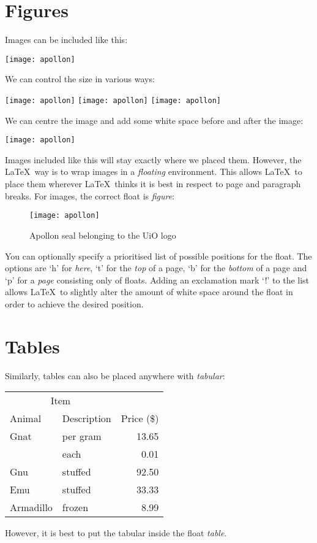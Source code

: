 \documentclass[a4paper]{memoir}
\begin{document}
\section{Figures}
Images can be included like this:

\texttt{[image: apollon]}

\noindent
We can control the size in various ways:

\texttt{[image: apollon]}
\texttt{[image: apollon]}
\texttt{[image: apollon]}

\noindent
We can centre the image and add some white space before and after the image:
\begin{center}
    \texttt{[image: apollon]}
\end{center}
Images included like this will stay exactly where we placed them. However, the \LaTeX\ way is to wrap images in a \emph{floating} environment. This allows \LaTeX\ to place them wherever \LaTeX\ thinks it is best in respect to page and paragraph breaks. For images, the correct float is \emph{figure}:

\begin{figure}[h!tbp]
    \centering
    \texttt{[image: apollon]}
    \caption{Apollon seal belonging to the UiO logo}
    \label{fig:apollon}
\end{figure}

You can optionally specify a prioritised list of possible positions for the float. The options are `h' for \emph{here}, `t' for the \emph{top} of a page, `b' for the \emph{bottom} of a page and `p' for a \emph{page} consisting only of floats. Adding an exclamation mark `!' to the list allows \LaTeX\ to slightly alter the amount of white space around the float in order to achieve the desired position.


\section{Tables}


Similarly, tables can also be placed anywhere with \emph{tabular}:

\begin{center}
    \begin{tabular}{llr}
        \toprule
        \multicolumn{2}{c}{Item} &            \\
        \cmidrule(r){1-2}
        Animal    & Description  & Price (\$) \\
        \midrule
        Gnat      & per gram     & 13.65      \\
                  & each         & 0.01       \\
        Gnu       & stuffed      & 92.50      \\
        Emu       & stuffed      & 33.33      \\
        Armadillo & frozen       & 8.99       \\
        \bottomrule
    \end{tabular}
\end{center}
However, it is best to put the tabular inside the float \emph{table}.
\end{document}
